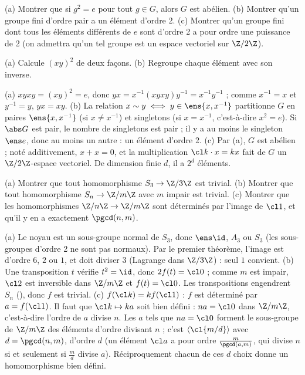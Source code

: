 \begin{exo}
(a) Montrer que si $g^2=e$ pour tout $g\in G$, alors $G$ est abélien. (b) Montrer qu'un groupe fini d'ordre pair a un élément d'ordre 2. (c) Montrer qu'un groupe fini dont tous les éléments différents de $e$ sont d'ordre 2 a pour ordre une puissance de 2 (on admettra qu'un tel groupe est un espace vectoriel sur $\Z/2\Z$).
\begin{indication}
(a) Calcule $(xy)^2$ de deux façons. (b) Regroupe chaque élément avec son inverse.
\end{indication}
\begin{corrige}
(a) $xyxy=(xy)^2=e$, donc $yx=x^{-1}(xyxy)y^{-1}=x^{-1}y^{-1}$ ; comme $x^{-1}=x$ et $y^{-1}=y$, $yx=xy$.
(b) La relation $x\sim y\iff y\in\ens{x,x^{-1}}$ partitionne $G$ en paires $\ens{x,x^{-1}}$ (si $x\neq x^{-1}$) et singletons (si $x=x^{-1}$, c'est-à-dire $x^2=e$). Si $\abs G$ est pair, le nombre de singletons est pair ; il y a au moins le singleton $\ens e$, donc au moins un autre : un élément d'ordre 2.
(c) Par (a), $G$ est abélien ; noté additivement, $x+x=0$, et la multiplication $\cl k\cdot x=kx$ fait de $G$ un $\Z/2\Z$-espace vectoriel. De dimension finie $d$, il a $2^d$ éléments.
\end{corrige}
\end{exo}
\begin{exo}
(a) Montrer que tout homomorphisme $S_3\to\Z/3\Z$ est trivial. (b) Montrer que tout homomorphisme $S_n\to\Z/m\Z$ avec $m$ impair est trivial. (c) Montrer que les homomorphismes $\Z/n\Z\to\Z/m\Z$ sont déterminés par l'image de $\cl1$, et qu'il y en a exactement $\pgcd(n,m)$.
\begin{corrige}
(a) Le noyau est un sous-groupe normal de $S_3$, donc $\ens\id$, $A_3$ ou $S_3$ (les sous-groupes d'ordre 2 ne sont pas normaux). Par le premier théorème, l'image est d'ordre $6$, $2$ ou $1$, et doit diviser $3$ (Lagrange dans $\Z/3\Z$) : seul $1$ convient.
(b) Une transposition $t$ vérifie $t^2=\id$, donc $2f(t)=\cl0$ ; comme $m$ est impair, $\cl2$ est inversible dans $\Z/m\Z$ et $f(t)=\cl0$. Les transpositions engendrent $S_n$ (), donc $f$ est trivial.
(c) $f(\cl k)=kf(\cl1)$ : $f$ est déterminé par $a=f(\cl1)$. Il faut que $\cl k\mapsto ka$ soit bien défini : $na=\cl0$ dans $\Z/m\Z$, c'est-à-dire l'ordre de $a$ divise $n$. Les $a$ tels que $na=\cl0$ forment le sous-groupe de $\Z/m\Z$ des éléments d'ordre divisant $n$ ; c'est $\langle\cl{m/d}\rangle$ avec $d=\pgcd(n,m)$, d'ordre $d$ (un élément $\cl a$ a pour ordre $\frac m{\pgcd(a,m)}$, qui divise $n$ si et seulement si $\frac md$ divise $a$). Réciproquement chacun de ces $d$ choix donne un homomorphisme bien défini.
\end{corrige}
\end{exo}

